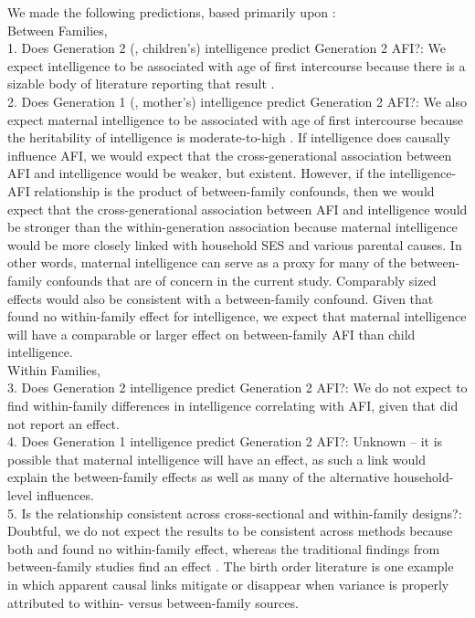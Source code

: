 \documentclass[a4paper,man,apacite,natbib,12pt,longtable]{apa6}\usepackage[]{graphicx}\usepackage[]{color}
\begin{document}
We made the following predictions, based primarily upon \citet{harden2011don}:\\ 
Between Families,\\
1. Does Generation 2 (\ie, children's) intelligence predict Generation 2 AFI?: We expect intelligence to be associated with age of first intercourse because there is a sizable body of literature reporting that result \citep{kirby2002effective, manlove1998influence, raffaelli2003sexual, rodgers1994df}.\\ 
2. Does Generation 1 (\ie, mother's) intelligence predict Generation 2 AFI?: We also expect maternal intelligence to be associated with age of first intercourse because the heritability of intelligence is moderate-to-high \citep{Bouchard2004,devlin1997heritability}. If intelligence does causally influence AFI, we would expect that the cross-generational association between AFI and intelligence would be weaker, but existent. However, if the intelligence-AFI relationship is the product of between-family confounds, then we would expect that the cross-generational association between AFI and intelligence would be stronger than the within-generation association because maternal intelligence would be more closely linked with household SES and various parental causes. In other words, maternal intelligence can serve as a proxy for many of the between-family confounds that are of concern in the current study. Comparably sized effects would also be consistent with a between-family confound. Given that \citet{harden2011don} found no within-family effect for intelligence, we expect that maternal intelligence will have a comparable or larger effect on between-family AFI than child intelligence.\\
Within Families,\\
3. Does Generation 2 intelligence predict Generation 2 AFI?: We do not expect to find within-family differences in intelligence correlating with AFI, given that \citet{harden2011don} did not report an effect.\\
4. Does Generation 1 intelligence predict Generation 2 AFI?: Unknown -- it is possible that maternal intelligence will have an effect, as such a link would explain the between-family effects as well as many of the alternative household-level influences.\\
5. Is the relationship consistent across cross-sectional and within-family designs?: Doubtful, we do not expect the results to be consistent across methods because both \citet{harden2011don} and \citet{Meredith2013} found no within-family effect, whereas the traditional findings from between-family studies find an effect \citep{kirby2002effective, manlove1998influence, raffaelli2003sexual}. The birth order literature is one example in which apparent causal links mitigate or disappear when variance is properly attributed to within- versus between-family sources.
\end{document}
